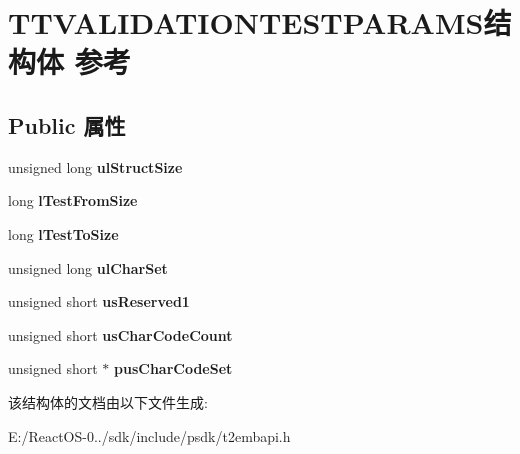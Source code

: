 \hypertarget{struct_t_t_v_a_l_i_d_a_t_i_o_n_t_e_s_t_p_a_r_a_m_s}{}\section{T\+T\+V\+A\+L\+I\+D\+A\+T\+I\+O\+N\+T\+E\+S\+T\+P\+A\+R\+A\+M\+S结构体 参考}
\label{struct_t_t_v_a_l_i_d_a_t_i_o_n_t_e_s_t_p_a_r_a_m_s}
\subsection*{Public 属性}
\begin{DoxyCompactItemize}
\item 
\mbox{\label{struct_t_t_v_a_l_i_d_a_t_i_o_n_t_e_s_t_p_a_r_a_m_s_ac062fd53651b28905ee0ad61517dd7a4}} 
unsigned long {\bfseries ul\+Struct\+Size}
\item 
\mbox{\label{struct_t_t_v_a_l_i_d_a_t_i_o_n_t_e_s_t_p_a_r_a_m_s_a71dc79a42c4609d0077522dc7bfe3132}} 
long {\bfseries l\+Test\+From\+Size}
\item 
\mbox{\label{struct_t_t_v_a_l_i_d_a_t_i_o_n_t_e_s_t_p_a_r_a_m_s_aa695dbe0a5a52d5c01f412080a39d068}} 
long {\bfseries l\+Test\+To\+Size}
\item 
\mbox{\label{struct_t_t_v_a_l_i_d_a_t_i_o_n_t_e_s_t_p_a_r_a_m_s_ad1f37e7fdc47a10ca97b5486713bcb3f}} 
unsigned long {\bfseries ul\+Char\+Set}
\item 
\mbox{\label{struct_t_t_v_a_l_i_d_a_t_i_o_n_t_e_s_t_p_a_r_a_m_s_a1695897052219112a28d4b8b52843bbc}} 
unsigned short {\bfseries us\+Reserved1}
\item 
\mbox{\label{struct_t_t_v_a_l_i_d_a_t_i_o_n_t_e_s_t_p_a_r_a_m_s_a9cc91d9e2d08a9e200aa0956beb56581}} 
unsigned short {\bfseries us\+Char\+Code\+Count}
\item 
\mbox{\label{struct_t_t_v_a_l_i_d_a_t_i_o_n_t_e_s_t_p_a_r_a_m_s_a819f6a0974e125c6bc6ef4f04fe1ed6a}} 
unsigned short $\ast$ {\bfseries pus\+Char\+Code\+Set}
\end{DoxyCompactItemize}


该结构体的文档由以下文件生成\+:\begin{DoxyCompactItemize}
\item 
E\+:/\+React\+O\+S-\/0../sdk/include/psdk/t2embapi.\+h\end{DoxyCompactItemize}
